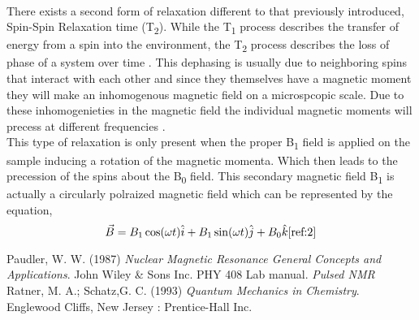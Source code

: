 \documentclass{article}
\begin{document}
{\begin{multicols}{2}
\\
There exists a second form of relaxation different to that previously 
introduced, Spin-Spin Relaxation time (T\textsubscript{2}). While the 
T\textsubscript{1} process describes the transfer of energy from a spin into 
the environment, the T\textsubscript{2} process describes the loss of phase of 
a system over time \cite{ref:3}. This dephasing is usually due to 
neighboring spins that interact with each other and since they themselves have 
a magnetic moment they will make an inhomogenous magnetic field on a 
microspcopic scale. Due to these inhomogenieties in the magnetic field the 
individual magnetic moments will precess at different frequencies \cite{ref:1}.
\\
This type of relaxation is only present when the proper B\textsubscript{1} 
field is applied on the sample inducing a rotation of the magnetic momenta. 
Which then leads to the precession of the spins about the B\textsubscript{0} 
field. This secondary magnetic field B\textsubscript{1} is actually a 
circularly polraized magnetic field which can be represented by the equation,
\begin{equation}
\vec{B} = B_1\cos(\omega t)\hat{i} + B_1\sin(\omega t)\hat{j} + B_0 \hat{k}
\label{eqn:10}
\cite{ref:2}
\end{equation}

\begin{thebibliography}{9}
Paudler, W. W. (1987) \emph{Nuclear Magnetic Resonance General 
Concepts and Applications}. John Wiley \& Sons Inc.
PHY 408 Lab manual. \emph{Pulsed NMR}
Ratner, M. A.; Schatz,G. C. (1993) \emph{Quantum Mechanics in Chemistry}. 
Englewood Cliffs, New Jersey : Prentice-Hall Inc.
\end{thebibliography}
\end{multicols}
}
\end{document}
